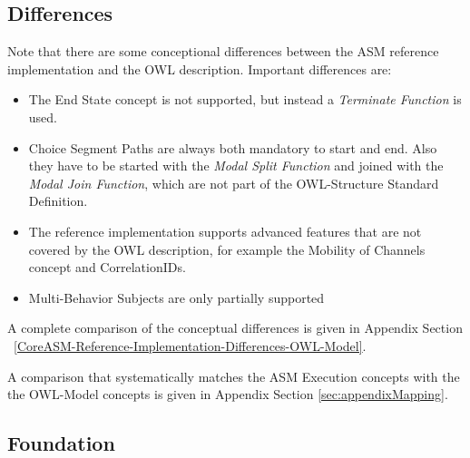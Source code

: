 \subsection{Differences}

Note that there are some conceptional differences between the ASM reference implementation and the OWL description. Important differences are:

\begin{itemize}
    \item The End State concept is not supported, but instead a \textit{Terminate Function} is used.
    \item Choice Segment Paths are always both mandatory to start and end. Also they have to be started with the \textit{Modal Split Function} and joined with the \textit{Modal Join Function}, which are not part of the OWL-Structure Standard Definition.
    \item The reference implementation supports advanced features that are not covered by the OWL description, for example the Mobility of Channels concept and CorrelationIDs.
    \item Multi-Behavior Subjects are only partially supported
\end{itemize}

A complete comparison of the conceptual differences is given in Appendix Section ~\ref{CoreASM-Reference-Implementation-Differences-OWL-Model}.

A comparison that systematically matches the ASM Execution concepts with the the OWL-Model concepts is given in Appendix Section \ref{sec:appendixMapping}.





\subsection{Foundation}

